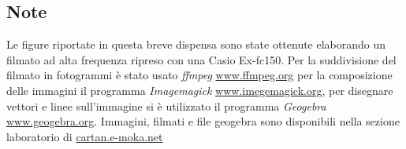 \documentclass[a4paper,10pt,oneside]{article}
\begin{document}
\subsection*{Note}
Le figure riportate in questa breve dispensa sono state ottenute elaborando un filmato ad alta frequenza ripreso con una Casio Ex-fc150. Per la suddivisione del filmato in fotogrammi è stato usato \emph{ffmpeg} \url{www.ffmpeg.org} per la composizione delle immagini il programma \emph{Imagemagick} \url{www.imegemagick.org}, per disegnare vettori e linee sull'immagine si è utilizzato il programma \emph{Geogebra} \url{www.geogebra.org}. Immagini, filmati e file geogebra sono disponibili nella sezione laboratorio di \url{cartan.e-moka.net}
\end{document}
